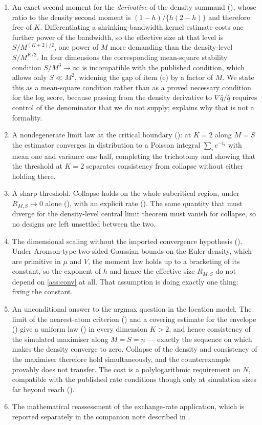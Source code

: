 \documentclass[11pt]{article}
\theoremstyle{definition}
\begin{document}
\begin{enumerate}[label=(\alph*)]
\item An exact second moment for the \emph{derivative} of the density summand (), whose ratio to the density second moment is $(1-h)/\{h(2-h)\}$ and therefore free of $K$. Differentiating a shrinking-bandwidth kernel estimate costs one further power of the bandwidth, so the effective size at that level is $S/M^{(K+2)/2}$, one power of $M$ more demanding than the density-level $S/M^{K/2}$. In four dimensions the corresponding mean-square stability condition $S/M^3\to\infty$ is incompatible with the published condition, which allows only $S\ll M^2$, widening the gap of item (e) by a factor of $M$. We state this as a mean-square condition rather than as a proved necessary condition for the log score, because passing from the density derivative to $\nabla\widehat q/\widehat q$ requires control of the denominator that we do not supply;  explains why that is not a formality.
\item A nondegenerate limit law at the critical boundary (): at $K=2$ along $M=S$ the estimator converges in distribution to a Poisson integral $\sum_ie^{-t_i}$ with mean one and variance one half, completing the trichotomy and showing that the threshold at $K=2$ separates consistency from collapse without either holding there.
\item A sharp threshold. Collapse holds on the whole subcritical region, under $R_{M,S}\to0$ alone (), with an explicit rate (). The same quantity that must diverge for the density-level central limit theorem must vanish for collapse, so no designs are left unsettled between the two.
\item The dimensional scaling without the imported convergence hypothesis (). Under Aronson-type two-sided Gaussian bounds on the Euler density, which are primitive in $\mu$ and $V$, the moment law holds up to a bracketing of its constant, so the exponent of $h$ and hence the effective size $R_{M,S}$ do not depend on \ref{ass:conv} at all. That assumption is doing exactly one thing: fixing the constant.
\item An unconditional answer to the argmax question in the location model. The limit of the nearest-atom criterion () and a covering estimate for the envelope () give a uniform law () in every dimension $K>2$, and hence consistency of the simulated maximiser along $M=S=n$ --- exactly the sequence on which  makes the density converge to zero. Collapse of the density and consistency of the maximiser therefore hold simultaneously, and the counterexample provably does not transfer. The cost is a polylogarithmic requirement on $N$, compatible with the published rate conditions though only at simulation sizes far beyond reach ().
\item The mathematical reassessment of the exchange-rate application, which is reported separately in the companion note described in .
\end{enumerate}
\end{document}
